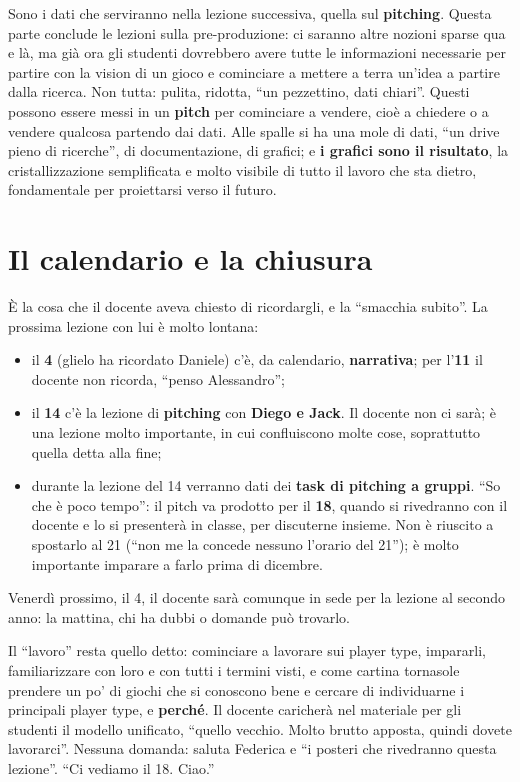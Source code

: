 Sono i dati che serviranno nella lezione successiva, quella sul \textbf{pitching}.
Questa parte conclude le lezioni sulla pre-produzione: ci saranno altre nozioni sparse
qua e là, ma già ora gli studenti dovrebbero avere tutte le informazioni necessarie
per partire con la vision di un gioco e cominciare a mettere a terra un'idea a partire
dalla ricerca. Non tutta: pulita, ridotta, ``un pezzettino, dati chiari''. Questi
possono essere messi in un \textbf{pitch} per cominciare a vendere, cioè a chiedere o
a vendere qualcosa partendo dai dati. Alle spalle si ha una mole di dati, ``un drive
pieno di ricerche'', di documentazione, di grafici; e \textbf{i grafici sono il
risultato}, la cristallizzazione semplificata e molto visibile di tutto il lavoro che
sta dietro, fondamentale per proiettarsi verso il futuro.

\section{Il calendario e la chiusura}
\label{gd18:sec:chiusura}

È la cosa che il docente aveva chiesto di ricordargli, e la ``smacchia subito''. La
prossima lezione con lui è molto lontana:
\begin{itemize}
  \item il \textbf{4} (glielo ha ricordato Daniele) c'è, da calendario,
        \textbf{narrativa}; per l'\textbf{11} il docente non ricorda, ``penso
        Alessandro'';
  \item il \textbf{14} c'è la lezione di \textbf{pitching} con \textbf{Diego e
        Jack}. Il docente non ci sarà; è una lezione molto importante, in cui
        confluiscono molte cose, soprattutto quella detta alla fine;
  \item durante la lezione del 14 verranno dati dei \textbf{task di pitching a
        gruppi}. ``So che è poco tempo'': il pitch va prodotto per il \textbf{18},
        quando si rivedranno con il docente e lo si presenterà in classe, per
        discuterne insieme. Non è riuscito a spostarlo al 21 (``non me la concede
        nessuno l'orario del 21''); è molto importante imparare a farlo prima di
        dicembre.
\end{itemize}
Venerdì prossimo, il 4, il docente sarà comunque in sede per la lezione al secondo
anno: la mattina, chi ha dubbi o domande può trovarlo.

Il ``lavoro'' resta quello detto: cominciare a lavorare sui player type, impararli,
familiarizzare con loro e con tutti i termini visti, e come cartina tornasole prendere
un po' di giochi che si conoscono bene e cercare di individuarne i principali player
type, e \textbf{perché}. Il docente caricherà nel materiale per gli studenti il
modello unificato, ``quello vecchio. Molto brutto apposta, quindi dovete lavorarci''.
Nessuna domanda: saluta Federica e ``i posteri che rivedranno questa lezione''.
``Ci vediamo il 18. Ciao.''

